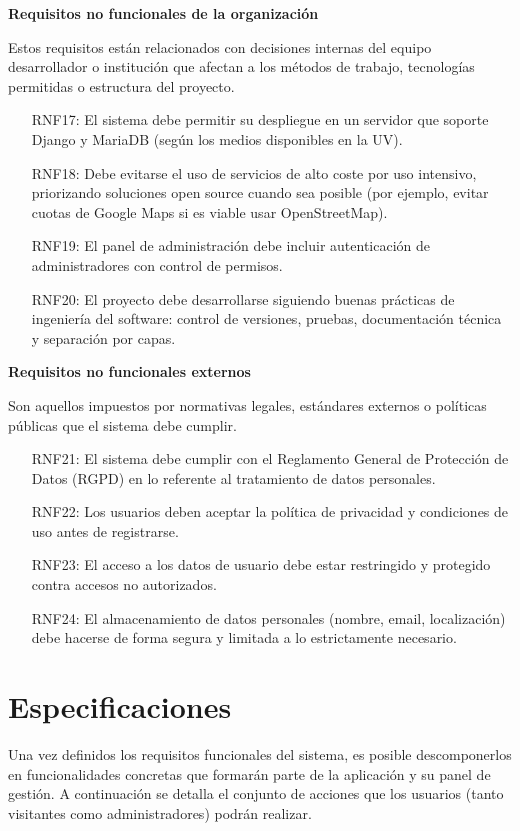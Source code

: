 \textbf{Requisitos no funcionales de la organización}

Estos requisitos están relacionados con decisiones internas del equipo desarrollador o institución que afectan a los métodos de trabajo, tecnologías permitidas o estructura del proyecto.

\begin{itemize}
    \item[RNF17:] El sistema debe permitir su despliegue en un servidor que soporte Django y MariaDB (según los medios disponibles en la UV).
    \item[RNF18:] Debe evitarse el uso de servicios de alto coste por uso intensivo, priorizando soluciones open source cuando sea posible (por ejemplo, evitar cuotas de Google Maps si es viable usar OpenStreetMap).
    \item[RNF19:] El panel de administración debe incluir autenticación de administradores con control de permisos.
    \item[RNF20:] El proyecto debe desarrollarse siguiendo buenas prácticas de ingeniería del software: control de versiones, pruebas, documentación técnica y separación por capas.
\end{itemize}

\textbf{Requisitos no funcionales externos}

Son aquellos impuestos por normativas legales, estándares externos o políticas públicas que el sistema debe cumplir.

\begin{itemize}
    \item[RNF21:] El sistema debe cumplir con el Reglamento General de Protección de Datos (RGPD) en lo referente al tratamiento de datos personales.
    \item[RNF22:] Los usuarios deben aceptar la política de privacidad y condiciones de uso antes de registrarse.
    \item[RNF23:] El acceso a los datos de usuario debe estar restringido y protegido contra accesos no autorizados.
    \item[RNF24:] El almacenamiento de datos personales (nombre, email, localización) debe hacerse de forma segura y limitada a lo estrictamente necesario.
\end{itemize}

\section{Especificaciones}
Una vez definidos los requisitos funcionales del sistema, es posible descomponerlos en funcionalidades concretas que formarán parte de la aplicación y su panel de gestión. A continuación se detalla el conjunto de acciones que los usuarios (tanto visitantes como administradores) podrán realizar.

